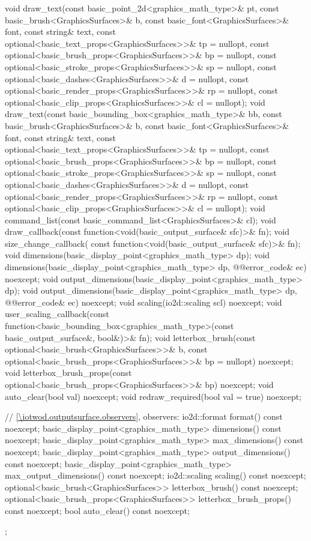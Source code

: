 \begin{codeblock}
{{    void draw_text(const basic_point_2d<graphics_math_type>& pt,
      const basic_brush<GraphicsSurfaces>& b,
      const basic_font<GraphicsSurfaces>& font, const string& text,
      const optional<basic_text_props<GraphicsSurfaces>>& tp = nullopt,
      const optional<basic_brush_props<GraphicsSurfaces>>& bp = nullopt,
      const optional<basic_stroke_props<GraphicsSurfaces>>& sp = nullopt,
      const optional<basic_dashes<GraphicsSurfaces>>& d = nullopt,
      const optional<basic_render_props<GraphicsSurfaces>>& rp = nullopt,
      const optional<basic_clip_props<GraphicsSurfaces>>& cl = nullopt);
    void draw_text(const basic_bounding_box<graphics_math_type>& bb,
      const basic_brush<GraphicsSurfaces>& b,
      const basic_font<GraphicsSurfaces>& font, const string& text,
      const optional<basic_text_props<GraphicsSurfaces>>& tp = nullopt,
      const optional<basic_brush_props<GraphicsSurfaces>>& bp = nullopt,
      const optional<basic_stroke_props<GraphicsSurfaces>>& sp = nullopt,
      const optional<basic_dashes<GraphicsSurfaces>>& d = nullopt,
      const optional<basic_render_props<GraphicsSurfaces>>& rp = nullopt,
      const optional<basic_clip_props<GraphicsSurfaces>>& cl = nullopt);
    void command_list(const basic_command_list<GraphicsSurfaces>& cl);
    void draw_callback(const function<void(basic_output_surface& sfc)>& fn);
    void size_change_callback(
      const function<void(basic_output_surface& sfc)>& fn);
    void dimensions(basic_display_point<graphics_math_type> dp);
    void dimensions(basic_display_point<graphics_math_type> dp, @\stdqualifier{}@error_code& ec) noexcept;
    void output_dimensions(basic_display_point<graphics_math_type> dp);
    void output_dimensions(basic_display_point<graphics_math_type> dp, 
      @\stdqualifier{}@error_code& ec) noexcept;
    void scaling(io2d::scaling scl) noexcept;
    void user_scaling_callback(const
      function<basic_bounding_box<graphics_math_type>(const basic_output_surface&, bool&)>& fn);
    void letterbox_brush(const optional<basic_brush<GraphicsSurfaces>>& b,
      const optional<basic_brush_props<GraphicsSurfaces>>& bp = nullopt) noexcept;
    void letterbox_brush_props(const optional<basic_brush_props<GraphicsSurfaces>>& bp) noexcept;
    void auto_clear(bool val) noexcept;
    void redraw_required(bool val = true) noexcept;
	
    // \ref{\iotwod.outputsurface.observers}, observers:
    io2d::format format() const noexcept;
    basic_display_point<graphics_math_type> dimensions() const noexcept;
    basic_display_point<graphics_math_type> max_dimensions() const noexcept;
    basic_display_point<graphics_math_type> output_dimensions() const noexcept;
    basic_display_point<graphics_math_type> max_output_dimensions() const noexcept;
    io2d::scaling scaling() const noexcept;
    optional<basic_brush<GraphicsSurfaces>> letterbox_brush() const noexcept;
    optional<basic_brush_props<GraphicsSurfaces>> letterbox_brush_props() const noexcept;
    bool auto_clear() const noexcept;
  };
}
\end{codeblock}

